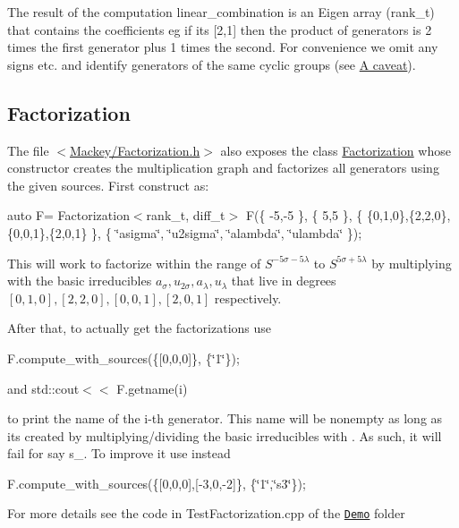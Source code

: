 The result of the computation {\ttfamily linear\+\_\+combination} is an Eigen array ({\ttfamily rank\+\_\+t}) that contains the coefficients eg if it\textquotesingle{}s {\ttfamily \mbox{[}2,1\mbox{]}} then the product of generators is 2 times the first generator plus 1 times the second. For convenience we omit any signs etc. and identify generators of the same cyclic groups (see \hyperlink{math_caveat}{A caveat}).\hypertarget{use_step1fact}{}\subsection{Factorization}\label{use_step1fact}
The file {\ttfamily $<$\hyperlink{Factorization_8h}{Mackey/\+Factorization.\+h}$>$} also exposes the class \hyperlink{classMackey_1_1Factorization}{Factorization} whose constructor creates the multiplication graph and factorizes all generators using the given sources. First construct as\+:

{\ttfamily auto F= Factorization$<$rank\+\_\+t, diff\+\_\+t$>$ F(\{ -\/5,-\/5 \}, \{ 5,5 \}, \{ \{0,1,0\},\{2,2,0\},\{0,0,1\},\{2,0,1\} \}, \{ \char`\"{}asigma\char`\"{}, \char`\"{}u2sigma\char`\"{}, \char`\"{}alambda\char`\"{}, \char`\"{}ulambda\char`\"{} \});}

This will work to factorize within the range of $S^{-5\sigma-5\lambda}$ to $S^{5\sigma+5\lambda}$ by multiplying with the basic irreducibles $ a_{\sigma}, u_{2\sigma}, a_{\lambda}, u_{\lambda}$ that live in degrees $[0,1,0],[2,2,0],[0,0,1],[2,0,1]$ respectively.

After that, to actually get the factorizations use

{\ttfamily F.\+compute\+\_\+with\+\_\+sources(\{\mbox{[}0,0,0\mbox{]}\}, \{\char`\"{}1\char`\"{}\});}

and {\ttfamily std\+::cout$<$$<$ F.\+getname(i) }

to print the name of the {\ttfamily i}-\/th generator. This name will be nonempty as long as it\textquotesingle{}s created by multiplying/dividing the basic irreducibles with {}. As such, it will fail for say {\ttfamily s\+\_}. To improve it use instead

{\ttfamily F.\+compute\+\_\+with\+\_\+sources(\{\mbox{[}0,0,0\mbox{]},\mbox{[}-\/3,0,-\/2\mbox{]}\}, \{\char`\"{}1\char`\"{},\char`\"{}s3\char`\"{}\});}

For more details see the code in Test\+Factorization.\+cpp of the \href{https://github.com/NickG-Math/Mackey/tree/master/Demo}{\tt Demo} folder 